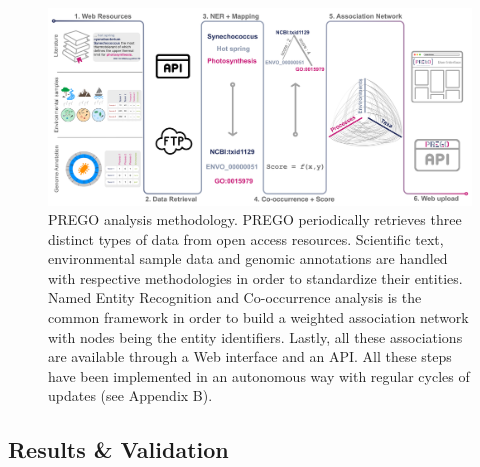    \begin{figure}[h]
      \centering
      \includegraphics[width=0.98\columnwidth]{figures/prego_analysis_horizontal.png}
      \caption{
         PREGO analysis methodology. PREGO periodically retrieves three distinct types of data from open access resources. Scientific text, environmental sample data and genomic annotations are handled with respective methodologies in order to standardize their entities. Named Entity Recognition and Co-occurrence analysis is the common framework in order to build a weighted association network with nodes being the entity identifiers. Lastly, all these associations are available through a Web interface and an API. All these steps have been implemented in an autonomous way with regular cycles of updates (see Appendix B).
      }
   \end{figure}



\subsection{Results \& Validation}




